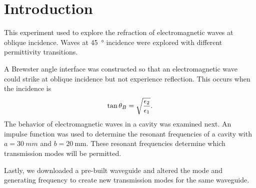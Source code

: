 \section{Introduction}\label{sec:intro}
This experiment used \mefisto{} to explore the refraction of electromagnetic waves at oblique incidence.
Waves at \SI{45}{\degree} incidence were explored with different permittivity transitions. 

A Brewster angle interface was constructed so that an electromagnetic wave could strike at oblique incidence but not experience reflection.
This occurs when the incidence is
\begin{equation}\label{eqn:brewster}
	\tan\theta_B = \sqrt{{\epsilon_2 \over \epsilon_1}}.
\end{equation}
The behavior of electromagnetic waves in a cavity was examined next.
An impulse function was used to determine the resonant frequencies of a cavity with $a = \SI{30}{mm}$ and $b = \SI{20}{\milli\meter}$.
These resonant frequencies determine which transmission modes will be permitted.

Lastly, we downloaded a pre-built \mefisto{} waveguide and altered the mode and generating frequency to create new transmission modes for the same waveguide.
